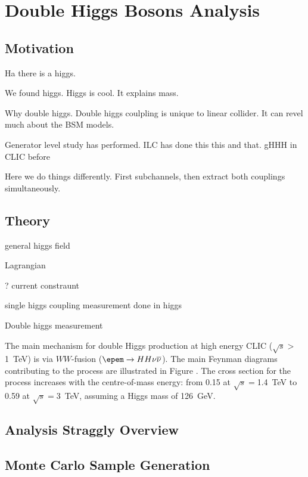 \chapter{Double Higgs Bosons Analysis}
\label{chap:DoubleHiggs}

\section{Motivation}

Ha there is a higgs.

We found higgs. Higgs is cool. It explains mass.

Why double higgs. Double higgs coulpling is unique to linear collider. It can revel much about the BSM models.

Generator level study has performed. ILC has done this this and that. gHHH in CLIC before

Here we do things differently. First subchannels, then extract both couplings simultaneously.

\section{Theory}

general higgs field

Lagrangian

? current constraunt

single higgs coupling measurement done in higgs

Double higgs measurement

The main mechanism for double Higgs production %
at high energy CLIC ($\sqrt{s}>$\SI{1}{\TeV}) is via $WW$-fusion ($\epem\to HH\nu\overline{\nu}$). The main Feynman diagrams contributing to the process are illustrated in Figure . The cross section for the process increases with the centre-of-mass energy: from \SI{0.15}{\fb} at $\sqrt{s}=$\SI{1.4}{\TeV} to \SI{0.59}{\fb} at $\sqrt{s}=$\SI{3}{\TeV}, assuming a Higgs mass of \SI{126}{GeV}.

\section{Analysis Straggly Overview}
\section{Monte Carlo Sample Generation}




